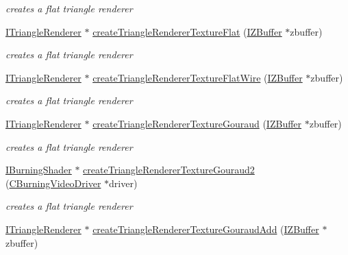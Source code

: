 \begin{DoxyCompactItemize}
\begin{DoxyCompactList}\small\item\em creates a flat triangle renderer \end{DoxyCompactList}\item 
\hyperlink{classirr_1_1video_1_1_i_triangle_renderer}{I\-Triangle\-Renderer} $\ast$ \hyperlink{namespaceirr_1_1video_a7d9b2001d421834f316bf083bd4b5cdf}{create\-Triangle\-Renderer\-Texture\-Flat} (\hyperlink{classirr_1_1video_1_1_i_z_buffer}{I\-Z\-Buffer} $\ast$zbuffer)
\begin{DoxyCompactList}\small\item\em creates a flat triangle renderer \end{DoxyCompactList}\item 
\hyperlink{classirr_1_1video_1_1_i_triangle_renderer}{I\-Triangle\-Renderer} $\ast$ \hyperlink{namespaceirr_1_1video_adf9f552b432b55e3ef0f2103ca079a73}{create\-Triangle\-Renderer\-Texture\-Flat\-Wire} (\hyperlink{classirr_1_1video_1_1_i_z_buffer}{I\-Z\-Buffer} $\ast$zbuffer)
\begin{DoxyCompactList}\small\item\em creates a flat triangle renderer \end{DoxyCompactList}\item 
\hyperlink{classirr_1_1video_1_1_i_triangle_renderer}{I\-Triangle\-Renderer} $\ast$ \hyperlink{namespaceirr_1_1video_a484cef35cef08c3df6a675a2cae6259a}{create\-Triangle\-Renderer\-Texture\-Gouraud} (\hyperlink{classirr_1_1video_1_1_i_z_buffer}{I\-Z\-Buffer} $\ast$zbuffer)
\begin{DoxyCompactList}\small\item\em creates a flat triangle renderer \end{DoxyCompactList}\item 
\hyperlink{classirr_1_1video_1_1_i_burning_shader}{I\-Burning\-Shader} $\ast$ \hyperlink{namespaceirr_1_1video_a5d22d593a774d47a8aadb94f69df7abd}{create\-Triangle\-Renderer\-Texture\-Gouraud2} (\hyperlink{classirr_1_1video_1_1_c_burning_video_driver}{C\-Burning\-Video\-Driver} $\ast$driver)
\begin{DoxyCompactList}\small\item\em creates a flat triangle renderer \end{DoxyCompactList}\item 
\hyperlink{classirr_1_1video_1_1_i_triangle_renderer}{I\-Triangle\-Renderer} $\ast$ \hyperlink{namespaceirr_1_1video_a325e417036bd3ef64eceb61820b299c2}{create\-Triangle\-Renderer\-Texture\-Gouraud\-Add} (\hyperlink{classirr_1_1video_1_1_i_z_buffer}{I\-Z\-Buffer} $\ast$zbuffer)

\end{DoxyCompactItemize}
